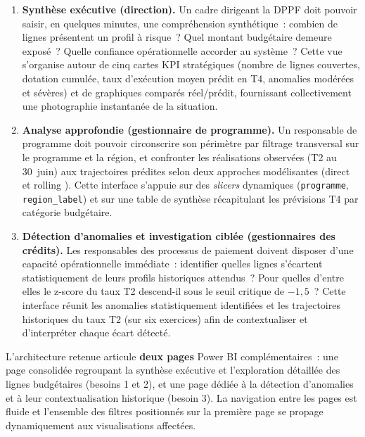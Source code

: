 \begin{enumerate}
    \item \textbf{Synthèse exécutive (direction).} Un cadre dirigeant la DPPF
    doit pouvoir saisir, en quelques minutes, une compréhension synthétique~:
    combien de lignes présentent un profil à risque~? Quel montant budgétaire
    demeure exposé~? Quelle confiance opérationnelle accorder au système~?
    Cette vue s'organise autour de cinq cartes KPI stratégiques (nombre de lignes
    couvertes, dotation cumulée, taux d'exécution moyen prédit en T4, anomalies
    modérées et sévères) et de graphiques comparés réel/prédit, fournissant
    collectivement une photographie instantanée de la situation.

    \item \textbf{Analyse approfondie (gestionnaire de programme).} Un responsable
    de programme doit pouvoir circonscrire son périmètre par filtrage transversal
    sur le programme et la région, et confronter les réalisations observées (T2 au
    30~juin) aux trajectoires prédites selon deux approches modélisantes
    (\og direct \fg{} et \og rolling \fg{}). Cette interface s'appuie sur des
    \textit{slicers} dynamiques (\texttt{programme}, \texttt{region\_label}) et sur
    une table de synthèse récapitulant les prévisions T4 par catégorie budgétaire.

    \item \textbf{Détection d'anomalies et investigation ciblée (gestionnaires des
    crédits).} Les responsables des processus de paiement doivent disposer d'une
    capacité opérationnelle immédiate~: identifier quelles lignes s'écartent
    statistiquement de leurs profils historiques attendus~? Pour quelles d'entre elles
    le z-score du taux T2 descend-il sous le seuil critique de $-1{,}5$~? Cette
    interface réunit les anomalies statistiquement identifiées et les trajectoires
    historiques du taux T2 (sur six exercices) afin de contextualiser et d'interpréter
    chaque écart détecté.
\end{enumerate}

L'architecture retenue articule \textbf{deux pages} Power BI complémentaires~:
une page consolidée regroupant la synthèse exécutive et l'exploration détaillée des
lignes budgétaires (besoins 1 et 2), et une page dédiée à la détection d'anomalies
et à leur contextualisation historique (besoin 3). La navigation entre les pages est
fluide et l'ensemble des filtres positionnés sur la première page se propage
dynamiquement aux visualisations affectées.

